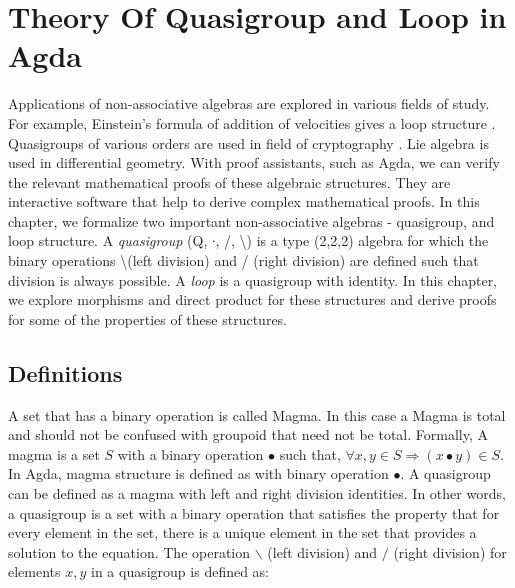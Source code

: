\chapter{Theory Of Quasigroup and Loop in Agda}
Applications of non-associative algebras are explored in various fields of
study. For example, Einstein's formula of addition of velocities gives a loop
structure \cite{ungar2007einstein}. Quasigroups of various orders are used in
field of cryptography \cite{phillips2010automated}. Lie algebra is used in
differential geometry\cite{quasigroupWiki}. With proof assistants, such as Agda,
we can verify the relevant mathematical proofs of these algebraic structures.
They are interactive software that help to derive complex mathematical proofs.
In this chapter, we formalize two important non-associative algebras -
quasigroup, and loop structure. A \textit{quasigroup} (Q, ∙, /, \textbackslash)
is a type (2,2,2) algebra for which the binary operations \textbackslash (left
division) and / (right division) are defined such that division is always
possible.  A \textit{loop} is a quasigroup with identity. In this chapter, we
explore morphisms and direct product for these structures and derive proofs for
some of the properties of these structures.
\section{Definitions}
A set that has a binary operation is called Magma. In this case a Magma is total
and should not be confused with groupoid that need not be total. Formally, A
magma is a set $S$ with a binary operation $∙$ such that, $\forall x,y \in S
\Rightarrow (x ∙ y) \in S$. In Agda, magma structure is defined as
 with binary operation $∙$. A quasigroup can be defined as a
magma with left and right division identities. In other words, a quasigroup is a
set with a binary operation that satisfies the property that for every element
in the set, there is a unique element in the set that provides a solution to the
equation. The operation $\backslash$ (left division) and $/$ (right division)
for elements $x,y$ in a quasigroup is defined as:

